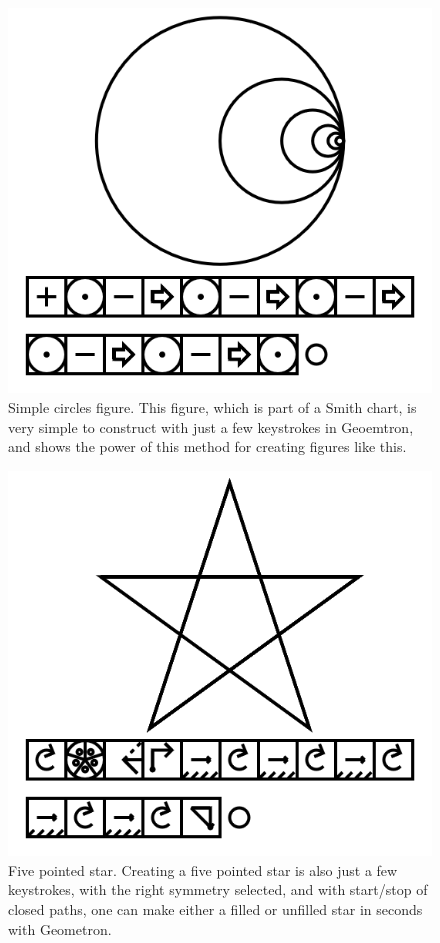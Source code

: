 \documentclass[11pt]{article}
\begin{document}
\begin{figure}

\includegraphics[width=\linewidth]{figures/figure16_circlesFractal.png}

\caption{Simple circles figure.  This figure, which is part of a Smith chart, is very simple to construct with just a few keystrokes in Geoemtron, and shows the power of this method for creating figures like this. }
\end{figure}




\begin{figure}

\includegraphics[width=\linewidth]{figures/figure17_star.png}

\caption{Five pointed star.  Creating a five pointed star is also just a few keystrokes, with the right symmetry selected, and with start/stop of closed paths, one can make either a filled or unfilled star in seconds with Geometron.}
\end{figure}
\end{document}
